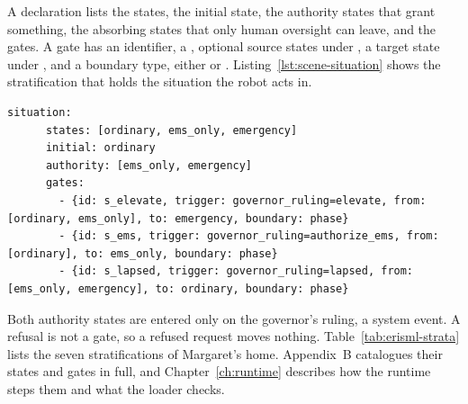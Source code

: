 A declaration lists the states, the initial state, the authority states that grant something, the
absorbing states that only human oversight can leave, and the gates. A gate has an identifier, a
, optional source states under , a target state under , and a
boundary type, either  or . Listing~\ref{lst:scene-situation} shows the
stratification that holds the situation the robot acts in.

\begin{lstlisting}[caption={The \code{situation} stratification (lines 1029 to 1036)}, label={lst:scene-situation}]
    situation:
      states: [ordinary, ems_only, emergency]
      initial: ordinary
      authority: [ems_only, emergency]
      gates:
        - {id: s_elevate, trigger: governor_ruling=elevate, from: [ordinary, ems_only], to: emergency, boundary: phase}
        - {id: s_ems, trigger: governor_ruling=authorize_ems, from: [ordinary], to: ems_only, boundary: phase}
        - {id: s_lapsed, trigger: governor_ruling=lapsed, from: [ems_only, emergency], to: ordinary, boundary: phase}
\end{lstlisting}

Both authority states are entered only on the governor's ruling, a system event. A refusal is not a
gate, so a refused request moves nothing. Table~\ref{tab:erisml-strata} lists the seven
stratifications of Margaret's home. Appendix~B catalogues their states and gates in full, and
Chapter~\ref{ch:runtime} describes how the runtime steps them and what the loader checks.

